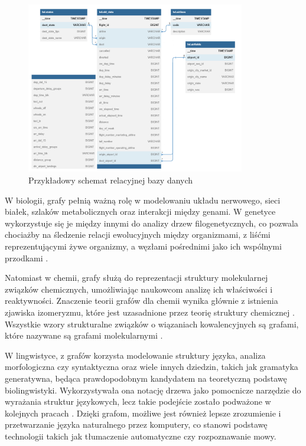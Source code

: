 \begin{figure}[ht]
	\centering
	\includegraphics[height=7.5cm]{partials/images/intro_database.png}
	\caption{Przykładowy schemat relacyjnej bazy danych}
    \label{Fig:intro-2}
\end{figure}

W biologii, grafy pełnią ważną rolę w modelowaniu układu nerwowego, sieci białek,
szlaków metabolicznych oraz interakcji między genami.
W genetyce wykorzystuje się je między innymi do analizy drzew filogenetycznych,
co pozwala chociażby na śledzenie relacji ewolucyjnych między organizmami,
z liśćmi reprezentującymi żywe organizmy, a węzłami pośrednimi jako ich wspólnymi przodkami \cite{Erciyes2023}.

Natomiast w chemii, grafy służą do reprezentacji struktury molekularnej związków chemicznych,
umożliwiając naukowcom analizę ich właściwości i reaktywności.
Znaczenie teorii grafów dla chemii wynika głównie z istnienia zjawiska izomeryzmu,
które jest uzasadnione przez teorię struktury chemicznej \cite{Balaban1985}.
Wszystkie wzory strukturalne związków o wiązaniach kowalencyjnych są grafami,
które nazywane są grafami molekularnymi \cite{Balaban1985}.

W lingwistyce, z grafów korzysta modelowanie struktury języka, analiza morfologiczna czy syntaktyczna oraz wiele innych dziedzin,
takich jak gramatyka generatywna, będąca prawdopodobnym kandydatem na teoretyczną podstawę biolingwistyki.
Wykorzystywała ona notację drzewa jako pomocnicze narzędzie do wyrażania struktur językowych,
lecz takie podejście zostało podważone w kolejnych pracach \cite{Arikawa2019}.
Dzięki grafom, możliwe jest również lepsze zrozumienie i przetwarzanie języka naturalnego przez komputery,
co stanowi podstawę technologii takich jak tłumaczenie automatyczne czy rozpoznawanie mowy.


